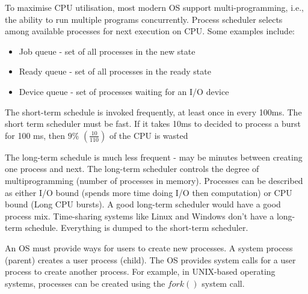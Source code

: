 \documentclass[a4paper]{article}
\theoremstyle{plain}
\theoremstyle{definition}
\newtheorem{defn}{Definition}[section]
\theoremstyle{remark}
\begin{document}
\begin{tcolorbox}[colback=black!3!white,colframe=black!60!white,title=\begin{defn}Process Scheduling \label{Process Scheduling}\end{defn}]
To maximise CPU utilisation, most modern OS support multi-programming, i.e., the ability to run multiple programs concurrently. Process scheduler selects among available processes for next execution on CPU. Some examples include:
\begin{itemize}
	\item Job queue - set of all processes in the new state
	\item Ready queue - set of all processes in the ready state
	\item Device queue - set of processes waiting for an I/O device
\end{itemize}
\end{tcolorbox}
\begin{tcolorbox}[colback=black!3!white,colframe=black!60!white,title=\begin{defn}Short-term Scheduler \label{Short-term Scheduler}\end{defn}]
The short-term schedule is invoked frequently, at least once in every 100ms. The short term scheduler must be fast. If it takes 10ms to decided to process a burst for 100 ms, then $9\%$ $(\frac{10}{110})$ of the CPU is wasted
\end{tcolorbox}
\begin{tcolorbox}[colback=black!3!white,colframe=black!60!white,title=\begin{defn}Long-Term Scheduler \label{Long-Term Scheduler}\end{defn}]
The long-term schedule is much less frequent - may be minutes between creating one process and next. The long-term scheduler controls the degree of multiprogramming (number of processes in memory). Processes can be described as either I/O bound (spends more time doing I/O then computation) or CPU bound (Long CPU bursts). A good long-term scheduler would have a good process mix. Time-sharing systems like Linux and Windows don't have a long-term schedule. Everything is dumped to the short-term scheduler.
\end{tcolorbox}
\begin{tcolorbox}[colback=black!3!white,colframe=black!60!white,title=\begin{defn}Process Creation \label{Process Creation}\end{defn}]
An OS must provide ways for users to create new processes. A system process (parent) creates a user process (child). The OS provides system calls for a user process to create another process. For example, in UNIX-based operating systems, processes can be created using the $fork\left(  \right) $ system call.
\end{tcolorbox}
\end{document}
